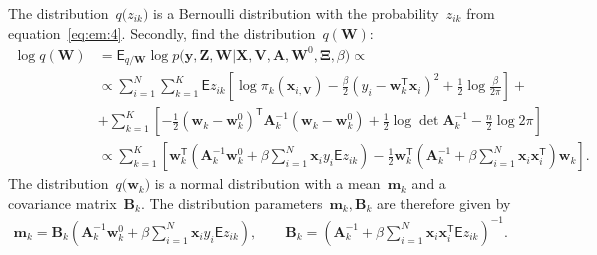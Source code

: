 \documentclass[12pt, twoside]{article}
\begin{document}
The distribution~$q\bigr(z_{ik}\bigr)$ is a Bernoulli distribution with the probability~$z_{ik}$ from equation~\eqref{eq:em:4}.
Secondly, find the distribution~$q\left(\textbf{W}\right)$:
\[
\label{eq:em:5}
\begin{aligned}
\log q\left(\textbf{W}\right) &= \mathsf{E}_{q/\textbf{W}}\log p\bigr(\mathbf{y}, \mathbf{Z}, \mathbf{W}|\mathbf{X}, \mathbf{V}, \textbf{A}, \textbf{W}^{0}, \bm{\Xi}, \beta\bigr) \propto\\
&\propto \sum_{i=1}^{N}\sum_{k=1}^{K}\mathsf{E}z_{ik}\left[\log\pi_{k}\left(\textbf{x}_{i, \textbf{V}}\right) - \frac{\beta}{2}\left(y_{i} - \textbf{w}_{k}^{\mathsf{T}}\textbf{x}_{i}\right)^{2} + \frac{1}{2}\log\frac{\beta}{2\pi}\right] + \\
&+ \sum_{k=1}^{K}\left[-\frac{1}{2}\left(\textbf{w}_{k} - \textbf{w}_{k}^{0}\right)^{\mathsf{T}}\textbf{A}_{k}^{-1}\left(\textbf{w}_{k} - \textbf{w}_{k}^{0}\right) + \frac{1}{2}\log\det\textbf{A}^{-1}_{k} - \frac{n}{2}\log2\pi\right] \\
&\propto \sum_{k=1}^{K}\left[\textbf{w}_{k}^{\mathsf{T}}\left(\textbf{A}_{k}^{-1}\textbf{w}_{k}^{0}+\beta\sum_{i=1}^{N}\textbf{x}_{i}y_{i}\mathsf{E}z_{ik}\right)-\frac{1}{2}\textbf{w}_{k}^{\mathsf{T}}\left(\textbf{A}_{k}^{-1}+\beta\sum_{i=1}^{N}\textbf{x}_{i}\textbf{x}_{i}^{\mathsf{T}}\right)\textbf{w}_{k}\right].
\end{aligned}
\]
The distribution~$q\bigr(\mathbf{w}_{k}\bigr)$ is a normal distribution with a mean~$\mathbf{m}_{k}$ and a covariance matrix~$\mathbf{B}_k$. The distribution parameters~$\mathbf{m}_{k}, \mathbf{B}_k$ are therefore given by
\[
\label{eq:em:6}
\begin{aligned}
\mathbf{m}_{k} = \mathbf{B}_{k}\left(\mathbf{A}_{k}^{-1}\mathbf{w}_{k}^{0}+\beta\sum_{i=1}^{N}\mathbf{x}_{i}y_{i}\mathsf{E}z_{ik}\right), \qquad \mathbf{B}_{k} = \left(\mathbf{A}_{k}^{-1}+\beta\sum_{i=1}^{N}\mathbf{x}_{i}\mathbf{x}_{i}^{\mathsf{T}}\mathsf{E}z_{ik}\right)^{-1}.
\end{aligned}
\]
\end{document}
